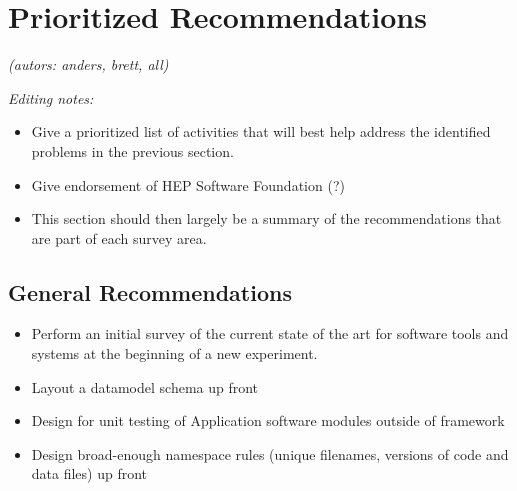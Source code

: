 \section{Prioritized Recommendations}

\textit{(autors: anders, brett, all)}

\textit{Editing notes:}
\begin{itemize}
\item Give a prioritized list of activities that will best help address the identified problems in the previous section. 
\item Give endorsement of HEP Software Foundation (?)
\item This section should then largely be a summary of the recommendations that are part of each survey area.
\end{itemize}
\subsection{General Recommendations}
\begin{itemize}
\item Perform an initial survey of the current state of the art for software tools and systems at the beginning of a new experiment.
\item Layout a datamodel schema up front
\item Design for unit testing of Application software modules outside of framework
\item Design broad-enough namespace rules (unique filenames, versions of code and data files) up front
\end{itemize}
